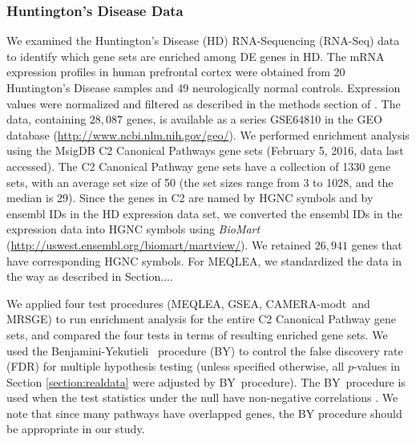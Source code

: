 \documentclass[useAMS,usenatbib, galley]{biom}
\newcommand{\OurMethod}{MEQLEA}
\newcommand{\CMT}{CAMERA-modt}
\newcommand{\genr}{MRSGE}
\newcommand{\FDR}{Benjamini-Yekutieli}
\newcommand{\FDRabb}{BY}
\begin{document}
	\subsubsection{Huntington's Disease Data}
	We examined the Huntington's Disease (HD) RNA-Sequencing (RNA-Seq) data \citep{labadorf2015rna}  to identify which gene sets are enriched among DE genes in HD. The mRNA expression profiles in human prefrontal cortex were obtained from 20 Huntington's Disease samples and 49 neurologically normal controls.  Expression values were normalized and filtered as described in the methods section of \cite{labadorf2015rna}.
	The data, containing $28,087$ genes, is available as a series GSE64810 in the GEO database (\url{http://www.ncbi.nlm.nih.gov/geo/}). We performed enrichment analysis using the MsigDB \citep{subramanian2005gene} C2 Canonical Pathways gene sets (February 5, 2016, data last accessed). The C2 Canonical Pathway gene sets have a collection of 1330 gene sets, with an average set size of 50 (the set sizes range from 3 to 1028, and the median is 29). Since the genes in C2 are named by HGNC symbols and by ensembl IDs in the HD expression data set, we converted the ensembl IDs in the expression data into HGNC symbols using \textit{BioMart} (\url{http://uswest.ensembl.org/biomart/martview/}). We retained $26,941$ genes that have corresponding HGNC symbols. For \OurMethod, we standardized the data in the way as described in Section....
	
	
	We applied four test procedures (\OurMethod, GSEA, \CMT~and \genr) to run enrichment analysis for the entire C2 Canonical Pathway gene sets, and compared the four tests in terms of resulting enriched gene sets. %
	We used the \FDR~\citep{benjamini2001control} procedure (\FDRabb) to control the false discovery rate (FDR) for multiple hypothesis testing (unless specified otherwise, all $p$-values in Section \ref{section:realdata} were adjusted by \FDRabb~procedure). The \FDRabb~procedure is used when the test statistics under the null have non-negative correlations \citep{benjamini2001control}. We note that since many pathways have overlapped genes, the BY procedure should be appropriate in our study.
	
\end{document}
